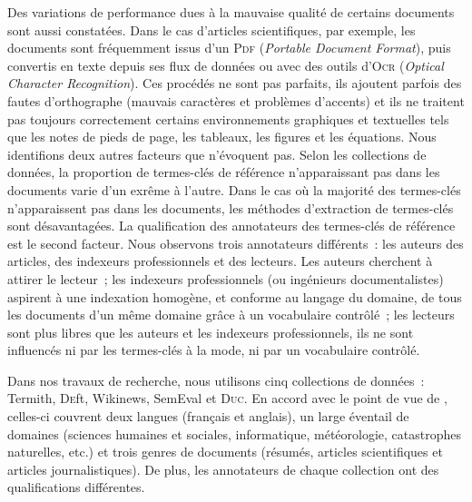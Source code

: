     Des variations de performance dues à la mauvaise qualité de certains
    documents sont aussi constatées. Dans le cas d'articles scientifiques, par
    exemple, les documents sont fréquemment issus d'un \textsc{Pdf}
    (\textit{Portable Document Format}), puis convertis en texte depuis ses flux
    de données ou avec des outils d'\textsc{Ocr} (\textit{Optical Character
    Recognition}). Ces procédés ne sont pas parfaits, ils ajoutent parfois des
    fautes d'orthographe (mauvais caractères et problèmes d'accents) et ils ne
    traitent pas toujours correctement certains environnements graphiques et
    textuelles tels que les notes de pieds de page, les tableaux, les figures et
    les équations. Nous identifions deux autres facteurs que
     n'évoquent pas. Selon les collections de
    données, la proportion de termes-clés de référence n'apparaissant pas dans
    les documents varie d'un exrême à l'autre. Dans le cas où la majorité des
    termes-clés n'apparaissent pas dans les documents, les méthodes d'extraction
    de termes-clés sont désavantagées. La qualification des annotateurs des
    termes-clés de référence est le second facteur. Nous observons trois
    annotateurs différents~: les auteurs des articles, des indexeurs
    professionnels et des lecteurs. Les auteurs cherchent à attirer le lecteur~;
    les indexeurs professionnels (ou ingénieurs documentalistes) aspirent à une
    indexation homogène, et conforme au langage du domaine, de tous les
    documents d'un même domaine grâce à un vocabulaire contrôlé~; les lecteurs
    sont plus libres que les auteurs et les indexeurs professionnels, ils ne
    sont influencés ni par les termes-clés \og{}à la mode\fg{}, ni par un
    vocabulaire contrôlé.

    Dans nos travaux de recherche, nous utilisons cinq collections de données~:
    Termith, \textsc{De}ft, Wikinews, SemEval et \textsc{Duc}. En accord avec le
    point de vue de , celles-ci couvrent deux
    langues (français et anglais), un large éventail de domaines (sciences
    humaines et sociales, informatique, météorologie, catastrophes naturelles,
    etc.) et trois genres de documents (résumés, articles scientifiques et
    articles journalistiques). De plus, les annotateurs de chaque collection ont
    des qualifications différentes.


